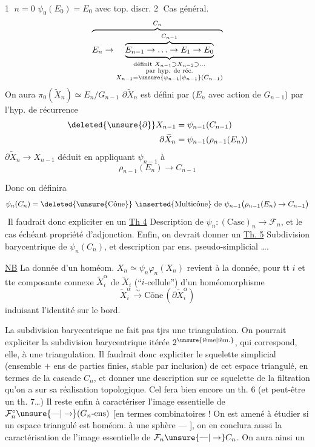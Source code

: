 \textcircled{1} $n=0$ \qquad $\psi_0(E_0)=E_0$ avec top. discr.
\textcircled{2} Cas général.
\[ \overbrace{E_n\to\underbrace{\overbrace{E_{n-1}\to\ldots\to E_1\to E_0}^{C_{n-1}}}_{\substack{\text{définit }X_{n-1}\supset X_{n-2}\supset\ldots\\\text{par hyp. de réc.}\\X_{n-1}=\unsure{\varphi_{n-1}|\psi_{n-1}}(C_{n-1})}}}^{C_n} \]
On aura \quad $\pi_0(\widetilde X_n)\simeq E_n/G_{n-1}$
$\partial\widetilde X_n$ est défini par  ($E_n$ avec action de $G_{n-1}$) par l'hyp. de récurrence
\[ \begin{aligned} \deleted{\unsure{\partial}}X_{n-1}&=\psi_{n-1}(C_{n-1})\\ \partial\widetilde X_n&=\psi_{n-1}(\rho_{n-1}(E_n)) \end{aligned} \]
$\partial\widetilde X_n\to X_{n-1}$ déduit en appliquant $\psi_{n-1}$ à
\[ \rho_{n-1}(E_n)\longrightarrow C_{n-1} \]

Donc on définira
\[ \psi_n(C_n)=\text{\deleted{\unsure{Cône}} \inserted{Multicône} de }\psi_{n-1}\bigl(\rho_{n-1}(E_n)\to C_{n-1}\bigr) \]
\textemdash\,\textemdash\,\textemdash\quad Il faudrait donc expliciter en un \uline{Th 4} Description de $\psi_n\colon(\mathrm{Casc})_n\to\mathcal F_n$, et le cas échéant propriété d'adjonction.
Enfin, on devrait donner un
\uline{Th. 5} Subdivision barycentrique de $\psi_n(C_n)$, et description par ens. pseudo-simplicial \ldots.

\uline{NB} La donnée d'un homéom. $X_n\simeq\psi_n\varphi_n(X_n)$ revient à la donnée, pour tt $i$ et tte composante connexe $\widetilde X_i^\alpha$ de $\widetilde X_i$ (``$i$-cellule'') d'un homéomorphisme
\[ \widetilde X_i^\alpha\xrightarrow{\sim}\mathrm{C\hat{o}ne}\,(\partial\widetilde X_i^\alpha) \]
induisant l'identité sur le bord.

La subdivision barycentrique ne fait pas tjrs une triangulation.
On pourrait expliciter la subdivision barycentrique itérée $2^{\text{\unsure{ième|ièm.}}}$, qui correspond, elle, à une triangulation. Il faudrait donc expliciter  le squelette simplicial (ensemble $+$ ens de parties finies, stable par inclusion) de cet espace triangulé, en termes de la cascade $C_n$, et donner une description sur ce  squelette de la filtration qu'on a sur sa réalisation topologique. Cel fera bien encore un th. 6 (et peut-être un th. 7\ldots)
Il reste enfin à caractériser l'image essentielle de $\mathcal F_n^\circ\unsure{\text{---}|\to}(G_n\text{-ens})$ [en termes combinatoires !
On est amené à étudier si un espace triangulé est homéom. à une sphère ---   ],
on en conclura aussi la caractérisation de l'image essentielle de $\mathcal F_n\unsure{\text{---}|\to}C_n$. On aura ainsi un 

